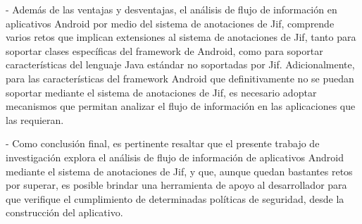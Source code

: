 - Además de las ventajas y desventajas, el análisis de flujo de información en
aplicativos Android por medio del sistema de anotaciones de Jif,
comprende varios retos que implican extensiones al sistema de anotaciones de
Jif, tanto para soportar clases específicas del framework de Android, como para
soportar características del lenguaje Java estándar no soportadas por Jif.\newline 
Adicionalmente, para las características del framework Android que
definitivamente no se puedan soportar mediante el sistema de anotaciones de Jif,
es necesario adoptar mecanismos que permitan analizar el flujo de información en
las aplicaciones que las requieran.

- Como conclusión final, es pertinente resaltar que el presente trabajo de
investigación explora el análisis de flujo de información de aplicativos Android
mediante el sistema de anotaciones de Jif, y que,  aunque quedan bastantes retos
por superar, es posible brindar una herramienta de apoyo al desarrollador para
que verifique el cumplimiento de determinadas políticas de seguridad, desde la
construcción del aplicativo.



